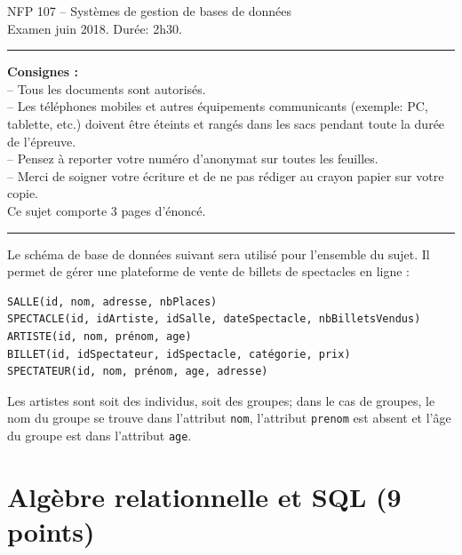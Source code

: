 \documentclass[10pt]{article}
\begin{document}
\begin{center}
{\Large NFP 107 -- Systèmes de gestion de bases de données}\\\vspace{1ex}
{\Large Examen juin 2018. Durée: 2h30.}\\

\end{center}

\vspace{1ex}
\hrule
\vspace{1ex}
\textbf{Consignes :}\\
-- Tous les documents sont autorisés.\\
-- Les téléphones mobiles et autres équipements communicants (exemple: PC, tablette, etc.)  doivent être éteints et rangés dans les sacs pendant toute la durée de l'épreuve.\\
-- Pensez à reporter votre numéro d'anonymat sur toutes les feuilles.\\
-- Merci de soigner votre écriture et de ne pas rédiger au crayon papier sur votre copie.\\
Ce sujet comporte 3 pages d'énoncé.

\vspace{1ex}
\hrule
\vspace{1ex}

%

\vspace{1ex}

Le schéma de base de données suivant sera utilisé pour l'ensemble du
sujet. Il permet de gérer une plateforme de vente de billets de spectacles en ligne :

\begin{verbatim}
SALLE(id, nom, adresse, nbPlaces)
SPECTACLE(id, idArtiste, idSalle, dateSpectacle, nbBilletsVendus)
ARTISTE(id, nom, prénom, age)
BILLET(id, idSpectateur, idSpectacle, catégorie, prix)
SPECTATEUR(id, nom, prénom, age, adresse) 
\end{verbatim}

Les artistes sont soit des individus, soit des groupes; dans le cas de groupes, le nom du groupe se trouve dans l'attribut \texttt{nom}, l'attribut \texttt{prenom} est absent et l'âge du groupe est dans l'attribut \texttt{age}.

\section{Algèbre relationnelle et SQL (9 points)}
\end{document}
